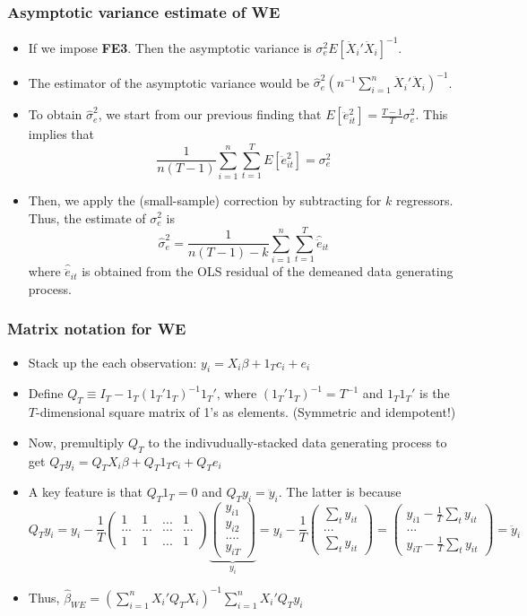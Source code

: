 \documentclass[aspectratio=169]{beamer}
\begin{document}
\begin{frame}
\frametitle{Asymptotic variance estimate of WE}
\begin{itemize}
\item If we impose \textbf{FE3}. Then the asymptotic variance is $\sigma_e^2E[\ddot{X}_i'\ddot{X}_i]^{-1}$.
\item The estimator of the asymptotic variance would be $\widehat{\sigma}_e^2\left(n^{-1}\sum_{i=1}^n \ddot{X}_i'\ddot{X}_i\right)^{-1}$. 
\item To obtain $\widehat{\sigma}_e^2$, we start from our previous finding that $E[\ddot{e}_{it}^2]=\frac{T-1}{T}\sigma_e^2$. This implies that
\[
\frac{1}{n(T-1)}\sum_{i=1}^n\sum_{t=1}^TE[\ddot{e}_{it}^2]=\sigma_e^2
\]
\item Then, we apply the (small-sample) correction by subtracting for $k$ regressors. Thus, the estimate of $\sigma_e^2$ is
\[
\widehat{\sigma}_e^2= \frac{1}{n(T-1)-k}\sum_{i=1}^n\sum_{t=1}^T\widehat{\ddot{e}}_{it}
\]
where $\widehat{\ddot{e}}_{it}$ is obtained from the OLS residual of the demeaned data generating process. 
\end{itemize}
\end{frame}

\begin{frame}
\frametitle{Matrix notation for WE}
\begin{itemize}
\item  Stack up the each observation: $y_i = X_i\beta+ 1_Tc_i + e_i$
\item Define $Q_T\equiv I_T-1_T(1_T'1_T)^{-1}1_T'$, where $(1_T'1_T)^{-1}=T^{-1}$ and $1_T1_T'$ is the $T$-dimensional square matrix of 1's as elements. (Symmetric and idempotent!)
\item Now, premultiply $Q_T$ to the indivudually-stacked data generating process to get $Q_Ty_i = Q_TX_i\beta+ Q_T1_Tc_i + Q_Te_i$
\item A key feature is that $Q_T1_T = 0$ and $Q_Ty_i = \ddot{y}_i$. The latter is because
\[
Q_T{y}_i={y}_i-\frac{1}{T}\begin{pmatrix} 1 & 1& ...& 1 \\ ... & ...& ...& ... \\1 & 1& ...& 1  \end{pmatrix}\underbrace{\begin{pmatrix}y_{i1}\\ y_{i2}\\ .... \\y_{iT}\end{pmatrix}}_{y_i}={y}_i-\frac{1}{T}\begin{pmatrix}\sum_t y_{it}\\ ...\\\sum_t y_{it}\end{pmatrix}=\begin{pmatrix}y_{i1}-\frac{1}{T}\sum_t y_{it}\\ ... \\y_{iT}-\frac{1}{T}\sum_t y_{it}\end{pmatrix}={\ddot{y}}_i
\]
\item Thus,  $ \hat{\beta}_{WE}=\left(\sum_{i=1}^n{X}_i'Q_T{X}_i\right)^{-1}\sum_{i=1}^n{X}_i'Q_T{y}_i$
\end{itemize}
\end{frame}
\end{document}
